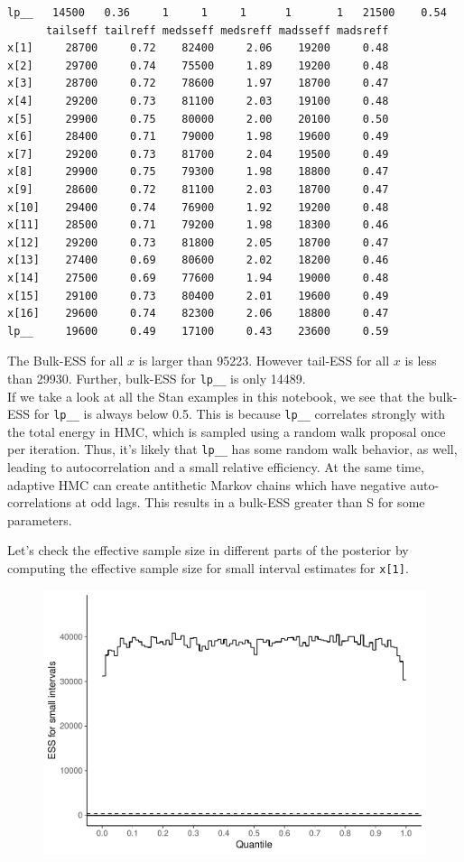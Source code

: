 \documentclass[american,]{article}
\begin{document}
\begin{verbatim}
lp__   14500   0.36     1     1     1      1       1   21500    0.54
      tailseff tailreff medsseff medsreff madsseff madsreff
x[1]     28700     0.72    82400     2.06    19200     0.48
x[2]     29700     0.74    75500     1.89    19200     0.48
x[3]     28700     0.72    78600     1.97    18700     0.47
x[4]     29200     0.73    81100     2.03    19100     0.48
x[5]     29900     0.75    80000     2.00    20100     0.50
x[6]     28400     0.71    79000     1.98    19600     0.49
x[7]     29200     0.73    81700     2.04    19500     0.49
x[8]     29900     0.75    79300     1.98    18800     0.47
x[9]     28600     0.72    81100     2.03    18700     0.47
x[10]    29400     0.74    76900     1.92    19200     0.48
x[11]    28500     0.71    79200     1.98    18300     0.46
x[12]    29200     0.73    81800     2.05    18700     0.47
x[13]    27400     0.69    80600     2.02    18200     0.46
x[14]    27500     0.69    77600     1.94    19000     0.48
x[15]    29100     0.73    80400     2.01    19600     0.49
x[16]    29600     0.74    82300     2.06    18800     0.47
lp__     19600     0.49    17100     0.43    23600     0.59
\end{verbatim}

The Bulk-ESS for all \(x\) is larger than 95223. However tail-ESS for
all \(x\) is less than 29930. Further, bulk-ESS for \texttt{lp\_\_} is
only 14489.\\
If we take a look at all the Stan examples in this notebook, we see that
the bulk-ESS for \texttt{lp\_\_} is always below 0.5. This is because
\texttt{lp\_\_} correlates strongly with the total energy in HMC, which
is sampled using a random walk proposal once per iteration. Thus, it's
likely that \texttt{lp\_\_} has some random walk behavior, as well,
leading to autocorrelation and a small relative efficiency. At the same
time, adaptive HMC can create antithetic Markov chains which have
negative auto-correlations at odd lags. This results in a bulk-ESS
greater than S for some parameters.

Let's check the effective sample size in different parts of the
posterior by computing the effective sample size for small interval
estimates for \texttt{x{[}1{]}}.

\begin{figure}[tp]
  \centering
  \includegraphics[width=0.6\linewidth]{graphics/local-ess-fit-n-1.pdf}
\end{figure}
\end{document}
